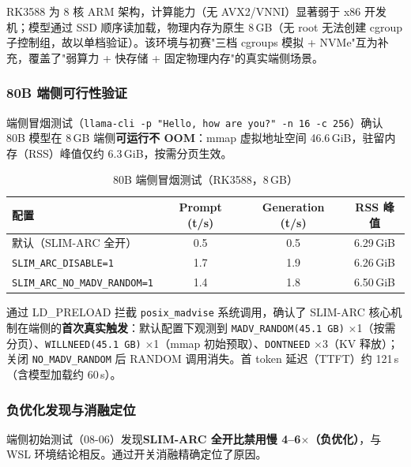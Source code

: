 RK3588 为 8 核 ARM 架构，计算能力（无 AVX2/VNNI）显著弱于 x86 开发机；模型通过 SSD 顺序读加载，物理内存为原生 8\,GB（无 root 无法创建 cgroup 子控制组，故以单档验证）。该环境与初赛"三档 cgroups 模拟 + NVMe"互为补充，覆盖了"弱算力 + 快存储 + 固定物理内存"的真实端侧场景。

\subsubsection{80B 端侧可行性验证}

端侧冒烟测试（\texttt{llama-cli -p "Hello, how are you?" -n 16 -c 256}）确认 80B 模型在 8\,GB 端侧\textbf{可运行不 OOM}：mmap 虚拟地址空间 46.6\,GiB，驻留内存（RSS）峰值仅约 6.3\,GiB，按需分页生效。

\begin{table}[H]
    \centering
    \caption{80B 端侧冒烟测试（RK3588，8\,GB）}
    \label{tab:edge_smoke}
    \begin{tabular}{lccc}
        \toprule
        \textbf{配置} & \textbf{Prompt (t/s)} & \textbf{Generation (t/s)} & \textbf{RSS 峰值} \\
        \midrule
        默认（SLIM-ARC 全开） & 0.5 & 0.5 & 6.29\,GiB \\
        \texttt{SLIM\_ARC\_DISABLE=1} & 1.7 & 1.9 & 6.26\,GiB \\
        \texttt{SLIM\_ARC\_NO\_MADV\_RANDOM=1} & 1.4 & 1.8 & 6.50\,GiB \\
        \bottomrule
    \end{tabular}
\end{table}

通过 LD\_PRELOAD 拦截 \texttt{posix\_madvise} 系统调用，确认了 SLIM-ARC 核心机制在端侧的\textbf{首次真实触发}：默认配置下观测到 \texttt{MADV\_RANDOM(45.1\,GB)} $\times$1（按需分页）、\texttt{WILLNEED(45.1\,GB)} $\times$1（mmap 初始预取）、\texttt{DONTNEED} $\times$3（KV 释放）；关闭 \texttt{NO\_MADV\_RANDOM} 后 RANDOM 调用消失。首 token 延迟（TTFT）约 121\,s（含模型加载约 60\,s）。

\subsubsection{负优化发现与消融定位}

端侧初始测试（08-06）发现\textbf{SLIM-ARC 全开比禁用慢 4--6$\times$（负优化）}，与 WSL 环境结论相反。通过开关消融精确定位了原因。

